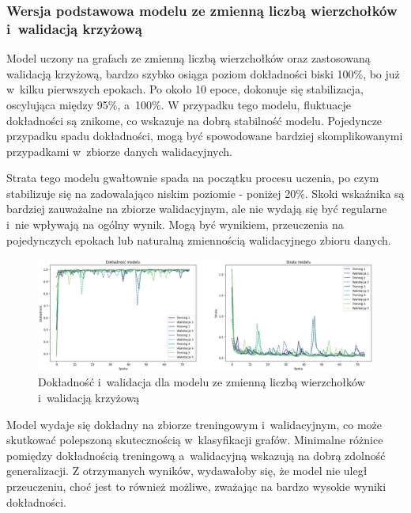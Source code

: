 \subsubsection{Wersja podstawowa modelu ze zmienną liczbą wierzchołków i~walidacją krzyżową}

Model uczony na grafach ze zmienną liczbą wierzchołków oraz zastosowaną walidacją krzyżową,
bardzo szybko osiąga poziom dokładności biski 100\%, bo już w~kilku pierwszych epokach.
Po około 10 epoce, dokonuje się stabilizacja, oscylująca między 95\%, a~100\%.
W przypadku tego modelu, fluktuacje dokładności są znikome, co wskazuje na dobrą stabilność modelu.
Pojedyncze przypadku spadu dokładności, mogą być spowodowane bardziej skomplikowanymi
przypadkami w~zbiorze danych walidacyjnych.

Strata tego modelu gwałtownie spada na początku procesu uczenia,
po czym stabilizuje się na zadowalająco niskim poziomie - poniżej 20\%.
Skoki wskaźnika są bardziej zauważalne na zbiorze walidacyjnym,
ale nie wydają się być regularne i~nie wpływają na ogólny wynik.
Mogą być wynikiem, przeuczenia na pojedynczych epokach lub naturalną zmiennością walidacyjnego zbioru danych.

\begin{figure}[ht]
	\centering
	\includegraphics[width=15.5cm]{resources/tests/images/v3/multiple_edges_crossvalid_img.png}
	\caption{Dokładność i~walidacja dla modelu ze zmienną liczbą wierzchołków i~walidacją krzyżową}
	\label{Fig:tests-csvar-0a}
\end{figure}
\FloatBarrier

Model wydaje się dokładny na zbiorze treningowym i~walidacyjnym,
co może skutkować polepszoną skutecznością w~klasyfikacji grafów.
Minimalne różnice pomiędzy dokładnością treningową a~walidacyjną wskazują na dobrą zdolność generalizacji.
Z otrzymanych wyników, wydawałoby się, że model nie uległ przeuczeniu,
choć jest to również możliwe, zważając na bardzo wysokie wyniki dokładności. 

